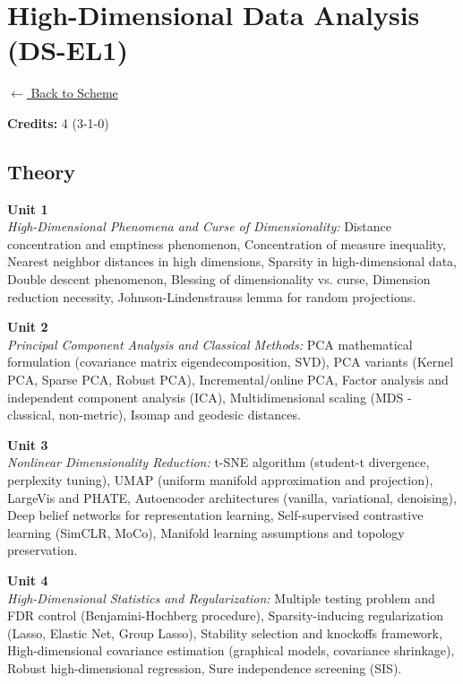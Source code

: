 \section*{High-Dimensional Data Analysis (DS-EL1)}
\label{elec:DS_1}

\noindent \small{\hyperref[main:scheme]{$\leftarrow$ Back to Scheme}} \vspace{0.5cm}

\noindent \textbf{Credits:} 4 (3-1-0)

\subsection*{Theory}
\noindent\textbf{Unit 1} \\
\textit{High-Dimensional Phenomena and Curse of Dimensionality:} Distance concentration and emptiness phenomenon, Concentration of measure inequality, Nearest neighbor distances in high dimensions, Sparsity in high-dimensional data, Double descent phenomenon, Blessing of dimensionality vs. curse, Dimension reduction necessity, Johnson-Lindenstrauss lemma for random projections.

\vspace{0.3cm}

\noindent\textbf{Unit 2} \\
\textit{Principal Component Analysis and Classical Methods:} PCA mathematical formulation (covariance matrix eigendecomposition, SVD), PCA variants (Kernel PCA, Sparse PCA, Robust PCA), Incremental/online PCA, Factor analysis and independent component analysis (ICA), Multidimensional scaling (MDS - classical, non-metric), Isomap and geodesic distances.

\vspace{0.3cm}

\noindent\textbf{Unit 3} \\
\textit{Nonlinear Dimensionality Reduction:} t-SNE algorithm (student-t divergence, perplexity tuning), UMAP (uniform manifold approximation and projection), LargeVis and PHATE, Autoencoder architectures (vanilla, variational, denoising), Deep belief networks for representation learning, Self-supervised contrastive learning (SimCLR, MoCo), Manifold learning assumptions and topology preservation.

\vspace{0.3cm}

\noindent\textbf{Unit 4} \\
\textit{High-Dimensional Statistics and Regularization:} Multiple testing problem and FDR control (Benjamini-Hochberg procedure), Sparsity-inducing regularization (Lasso, Elastic Net, Group Lasso), Stability selection and knockoffs framework, High-dimensional covariance estimation (graphical models, covariance shrinkage), Robust high-dimensional regression, Sure independence screening (SIS).

